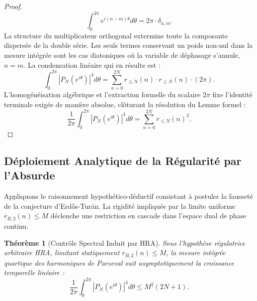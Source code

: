 \documentclass[12pt,a4paper]{article}
\newtheorem{theorem}{Th\'eor\`eme}[section]
\begin{document}
\begin{proof}
\begin{equation}
\int_0^{2\pi} e^{i(n-m)\theta} d\theta = 2\pi \cdot \delta_{n,m}.
\end{equation}
La structure du multiplicateur orthogonal extermine toute la composante dispers\'ee de la double s\'erie. Les seuls termes conservant un poids non-nul dans la mesure int\'egr\'ee sont les cas diatoniques o\`u la variable de d\'ephasage s'annule, $n=m$. La condensation lin\'eaire qui en r\'esulte est :
\begin{equation}
\int_0^{2\pi} |P_N(e^{i\theta})|^4 d\theta = \sum_{n=0}^{2N} r_{\le N}(n) \cdot r_{\le N}(n) \cdot (2\pi).
\end{equation}
L'homog\'en\'eisation alg\'ebrique et l'extraction formelle du scalaire $2\pi$ fixe l'identit\'e terminale exig\'ee de mani\`ere absolue, cl\^oturant la r\'esolution du Lemme formel :
\begin{equation}
\frac{1}{2\pi} \int_0^{2\pi} |P_N(e^{i\theta})|^4 d\theta = \sum_{n=0}^{2N} r_{\le N}(n)^2.
\end{equation}
\end{proof}

\subsection{D\'eploiement Analytique de la R\'egularit\'e par l'Absurde}

Appliquons le raisonnement hypoth\'etico-d\'eductif consistant \`a postuler la fausset\'e de la conjecture d'Erd\H{o}s-Tur\'an. La rigidit\'e impliqu\'ee par la limite uniforme $r_{B,2}(n) \le M$ d\'eclenche une restriction en cascade dans l'espace dual de phase continu.

\begin{theorem}[Contr\^ole Spectral Induit par HRA]
Sous l'hypoth\`ese r\'egulatrice arbitraire HRA, limitant statiquement $r_{B,2}(n) \le M$, la mesure int\'egr\'ee quartique des harmoniques de Parseval suit asymptotiquement la croissance temporelle lin\'eaire :
\begin{equation}
\frac{1}{2\pi} \int_0^{2\pi} |P_N(e^{i\theta})|^4 d\theta \le M^2(2N+1).
\end{equation}
\end{theorem}
\end{document}
